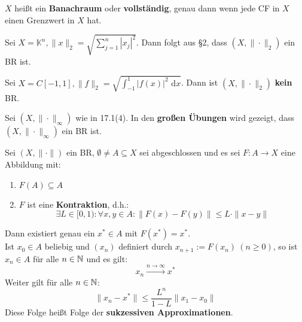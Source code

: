 \documentclass[a4paper,oneside,DIV15,BCOR12mm,chapterprefix=true,headings=onelinechapter]{scrbook}
\begin{document}
\begin{definition}
$X$ heißt ein \textbf{Banachraum} oder \textbf{vollständig}, genau dann wenn jede
CF in $X$ einen Grenzwert in $X$ hat.
\end{definition}

\begin{beispiele}
\item Sei $X=\mathbb{K}^n, \|x\|_2=\sqrt{\sum_{j=1}^n |x_j|^2}$. Dann folgt aus §2,
dass $(X,\|\cdot\|_2)$ ein BR ist.
\item Sei $X=C[-1,1], \|f\|_2=\sqrt{\int_{-1}^1 |f(x)|^2 \text{ d}x}$. Dann ist
$(X,\|\cdot\|_2)$ \textbf{kein} BR.
\item Sei $(X,\|\cdot\|_\infty)$ wie in 17.1(4). In den \textbf{\color{red}großen Übungen} wird gezeigt,
dass $(X,\|\cdot\|_\infty)$ ein BR ist.
\end{beispiele}

\begin{satz}
    Sei $(X,\|\cdot\|)$ ein BR, $\emptyset\ne A\subseteq X$ sei abgeschlossen und es sei
    $F:A\to X$ eine Abbildung mit:
    \renewcommand{\labelenumi}{(\roman{enumi})}
    \begin{enumerate}
    \item $F(A)\subseteq A$
    \item $F$ ist eine \textbf{Kontraktion}, d.h.:
    \[\exists L\in[0,1):\forall x,y\in A:\|F(x)-F(y)\|\le L\cdot \|x-y\|\]
    \end{enumerate}
    \renewcommand{\labelenumi}{(\arabic{enumi})}
    Dann existiert genau ein $x^*\in A$ mit $F(x^*)=x^*$.\\
    Ist $x_0\in A$ beliebig und $(x_n)$ definiert durch $x_{n+1}:=F(x_n)\ (n\ge 0)$,
    so ist $x_n\in A$ für alle $n\in\mathbb{N}$ und es gilt:
    \[x_n\stackrel{n\to\infty}\to x^*\]
    Weiter gilt für alle $n\in\mathbb{N}$:
    \[\|x_n-x^*\|\le\frac{L^n}{1-L}\|x_1-x_0\|\]
    Diese Folge heißt Folge der \textbf{sukzessiven Approximationen}.
\end{satz}
\end{document}
